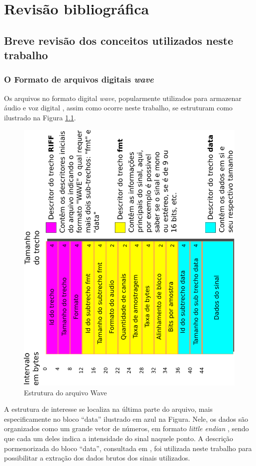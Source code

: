 \chapter{Revisão bibliográfica} \label{chap:revBibli}
	\section{Breve revisão dos conceitos utilizados neste trabalho}

		\subsection{O Formato de arquivos digitais  \textit{wave}}
			\par Os arquivos no formato digital \textit{wave}, popularmente utilizados para armazenar áudio e voz digital \cite{WAVE2019}, assim como ocorre neste trabalho, se estruturam como ilustrado na Figura \ref{fig:wavePcmStructure}.
		
			\begin{figure}[h]
				\centering
				\includegraphics[width=0.6\linewidth, angle=-90]{images/wavePcmStructure.pdf}
				\caption{Estrutura do arquivo Wave}
				\label{fig:wavePcmStructure}
			\end{figure}
			
			\par A estrutura de interesse se localiza na última parte do arquivo, mais especificamente no bloco ``data'' ilustrado em azul na Figura. Nele, os dados são organizados como um grande vetor de números, em formato \textit{little endian} \cite{adiga2007writing}, sendo que cada um deles indica a intensidade do sinal naquele ponto. A descrição pormenorizada do bloco ``data'', consultada em \cite{microsoftIbmWaveSpec}, foi utilizada neste trabalho para possibilitar a extração dos dados brutos dos sinais utilizados. 

